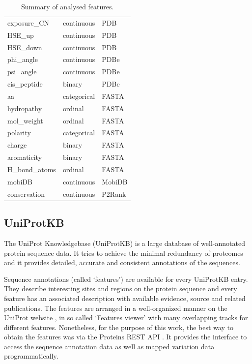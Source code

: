 \begin{table}[]
\begin{tabular}{@{}lll@{}}
exposure\_CN         & continuous  & PDB                   \\
HSE\_up              & continuous  & PDB                   \\
HSE\_down            & continuous  & PDB                   \\
phi\_angle           & continuous  & PDBe                  \\
psi\_angle           & continuous  & PDBe                  \\
cis\_peptide         & binary      & PDBe                  \\
aa                   & categorical & FASTA                 \\
hydropathy           & ordinal     & FASTA                 \\
mol\_weight          & ordinal     & FASTA                 \\
polarity             & categorical & FASTA                 \\
charge               & binary      & FASTA                 \\
aromaticity          & binary      & FASTA                 \\
H\_bond\_atoms       & ordinal     & FASTA                 \\
mobiDB               & continuous  & MobiDB                \\
conservation         & continuous  & P2Rank \\ \bottomrule
\end{tabular}
\caption{Summary of analysed features.}
\label{tab:features}
\end{table}

\subsection{UniProtKB}

The UniProt Knowledgebase (UniProtKB) \cite{uniprot} is a large database of well-annotated protein sequence data. It tries to achieve the minimal redundancy of proteomes and it provides detailed, accurate and consistent annotations of the sequences.

Sequence annotations (called `features') are available for every UniProtKB entry. They describe interesting sites and regions on the protein sequence and every feature has an associated description with available evidence, source and related publications. The features are arranged in a well-organized manner on the UniProt website \cite{uniprot_web}, in so called `Features viewer' with many overlapping tracks for different features. Nonetheless, for the purpose of this work, the best way to obtain the features was via the Proteins REST API \cite{proteins_api}. It provides the interface to  access the sequence annotation data as well as mapped variation data programmatically.

